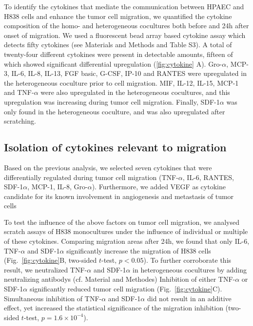 To identify the cytokines that mediate the communication between
HPAEC and H838 cells and enhance the tumor cell migration,
we quantified the cytokine composition
of the  homo- and heterogeneous cocultures
both before and 24h after onset of migration.
We used a  fluorescent bead array based cytokine assay which detects fifty cytokines
(see Materials and Methods and Table S3).
A total of twenty-four different cytokines were present in detectable amounts,
fifteen of which showed significant differential upregulation
(\ref{fig:cytokine} A).
Gro-$\alpha$, MCP-3, IL-6, IL-8, IL-13, FGF basic, G-CSF, IP-10 and RANTES were
upregulated in the heterogeneous coculture prior to cell migration.
MIF, IL-12, IL-15, MCP-1 and TNF-$\alpha$ were also upregulated
in the heterogeneous cocultures, and this upregulation was increasing
during tumor cell migration.
Finally, SDF-1$\alpha$ was only found in the heterogeneous coculture,
and was also upregulated after scratching. 

\subsection*{Isolation of cytokines relevant to migration}

Based on the previous analysis, 
we selected seven cytokines that were differentially regulated  
during tumor cell migration 
(TNF-$\alpha$, IL-6, RANTES, SDF-1$\alpha$, MCP-1, IL-8, Gro-$\alpha$).
Furthermore, we added VEGF as cytokine candidate for its known involvement in
angiogenesis and metastasis of tumor cells~\cite{Ferrara2003,Hiratsuka2002} 

To test the influence of the above factors on tumor cell migration,
we analysed scratch assays of H838 monocultures under the influence of 
individual or multiple of these cytokines. 
Comparing migration areas after 24h, 
we found that only IL-6, TNF-$\alpha$ and SDF-1$\alpha$ significantly 
increase the migration of H838 cells (Fig.~\ref{fig:cytokine}B, two-sided $t$-test,
$p < 0.05$). 
To further corroborate this result, we neutralized 
TNF-$\alpha$ and SDF-1$\alpha$ in heterogeneous cocultures  by adding neutralizing antibodys (cf. Material and Methodes)
Inhibition of  either TNF-$\alpha$ or SDF-1$\alpha$ significantly reduced tumor cell migration (Fig.~\ref{fig:cytokine}C). 
Simultaneous inhibition of TNF-$\alpha$ and SDF-1$\alpha$ did not result in an additive effect, yet increased the statistical significance of the migration 
inhibition
(two-sided $t$-test, $p=1.6\times10^{-4}$).

